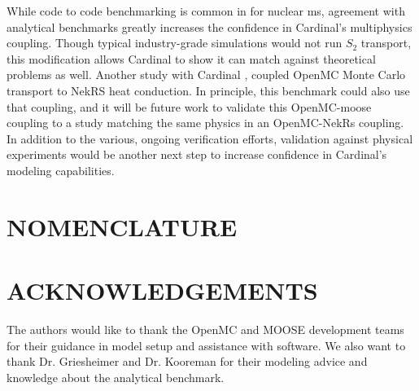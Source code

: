 \documentclass[letterpaper]{mc2023}
\begin{document}
While code to code benchmarking is common in for nuclear \gls{ms}, agreement with analytical benchmarks greatly increases the confidence in Cardinal's
multiphysics coupling. Though typical industry-grade simulations would not run $S_{2}$ transport, this modification allows Cardinal to show it can
match against theoretical problems as well. Another study with Cardinal \cite{novak-2023}, coupled OpenMC Monte Carlo transport to NekRS heat conduction.
In principle, this benchmark could also use that coupling, and it will be future work to validate this OpenMC-\gls{moose} coupling to a study matching
the same physics in an OpenMC-NekRs coupling. In addition to the various, ongoing verification efforts, validation against physical experiments would be
another next step to increase confidence in Cardinal's modeling capabilities.
\section*{NOMENCLATURE}

\printglossary[title={Nomenclature}, nonumberlist, nopostdot]

\section*{ACKNOWLEDGEMENTS}
The authors would like to thank the OpenMC and MOOSE development teams for their guidance in model setup and assistance
with software. We also want to thank Dr. Griesheimer and Dr. Kooreman for their modeling advice and knowledge about the
analytical benchmark.

\setlength{\baselineskip}{12pt}


\setlength{\baselineskip}{12pt}
\end{document}
